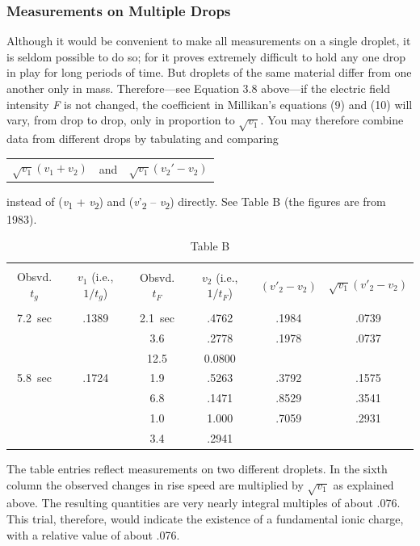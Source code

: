 \subsubsection*{Measurements on Multiple Drops}
Although it would be convenient to make all measurements on a single
droplet, it is seldom possible to do so; for it proves extremely
difficult to hold any one drop in play for long periods of time. But
droplets of the same material differ from one another only in mass.
Therefore---see Equation 3.8 above---if the electric field intensity
\emph{F} is not changed, the coefficient in Millikan's equations (9) and
(10) will vary, from drop to drop, only in proportion to $\sqrt{v_1}$. You may
therefore combine data from different drops by tabulating and comparing
\begin{center}
\begin{tabular}{ c c c }
$\sqrt{v_1}(v_1+v_2)$ & and & $\sqrt{v_1}(v_{2}'-v_2)$\\
\end{tabular}
\end{center}
instead of (\emph{v}\textsubscript{1} + \emph{v}\textsubscript{2}) and
(\emph{v}'\textsubscript{2} -- \emph{v}\textsubscript{2}) directly. See Table B
(the figures are from 1983).

\begin{table}[htp]
\centering
\small
\begin{tabular}{S S S S S S}
\hline\\[-10pt]
{Obsvd. $t_g$} & {$v_1$ (i.e., $1/t_g$)} & {Obsvd. $t_F$} & {$v_2$ (i.e., $1/t_F$)} & {\phantom{00}$(v'_2-v_2)$} & {$\sqrt{v_1}(v'_2-v_2)$}\\[1pt]
\hline\\[-10pt]
7.2\ {sec} & .1389 & 2.1\ {sec} & .4762 & .1984 & .0739\\
 & & 3.6 & .2778 & .1978 & .0737\\
 & & 12.5 & 0.0800 & &\\
5.8\ {sec} & .1724 & 1.9 & .5263 & .3792 & .1575\\
 & & 6.8 & .1471 & .8529 & .3541\\
 & & 1.0 & 1.000 & .7059 & .2931\\
 & & 3.4 & .2941 & &\\
\end{tabular}
\caption*{Table B}
\end{table}

The table entries reflect measurements on two different droplets. In the
sixth column the observed changes in rise speed are multiplied by
$\sqrt{v_1}$ as explained above. The resulting quantities
are very nearly integral multiples of about .076. This trial, therefore,
would indicate the existence of a fundamental ionic charge, with a
relative value of about .076.

